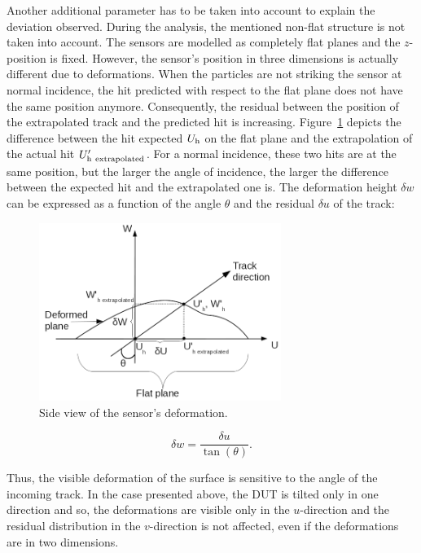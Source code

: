       Another additional parameter has to be taken into account to explain the deviation observed.
      During the analysis, the mentioned non-flat structure is not taken into account.
      The sensors are modelled as completely flat planes and the $z$-position is fixed.
      However, the sensor's position in three dimensions is actually different due to deformations.
      When the particles are not striking the sensor at normal incidence, the hit predicted with respect to the flat plane does not have the same position anymore.
      Consequently, the residual between the position of the extrapolated track and the predicted hit is increasing.
      Figure~\ref{fig:originDef} depicts the difference between the hit expected $U_{\rm{h}}$ on the flat plane and the extrapolation of the actual hit $U'_{\rm{h~extrapolated}}$.
      For a normal incidence, these two hits are at the same position, but the larger the angle of incidence, the larger the difference between the expected hit and the extrapolated one is.
      The deformation height $\delta w$ can be expressed as a function of the angle $\theta$ and the residual $\delta u$ of the track:

      \begin{figure}[!tbh]
      \centering
        \includegraphics[width = 0.7\textwidth]{Pictures/deformation/origin_deformation.png}
        \caption{Side view of the sensor's deformation.}
        \label{fig:originDef}
      \end{figure}

      \begin{equation}
        \delta w = \frac{\delta u}{\tan(\theta)}.
        \label{eq:deltaW}
      \end{equation}

      Thus, the visible deformation of the surface is sensitive to the angle of the incoming track.
      In the case presented above, the \gls{DUT} is tilted only in one direction and so, the deformations are visible only in the $u$-direction and the residual distribution in the $v$-direction is not affected, even if the deformations are in two dimensions.


